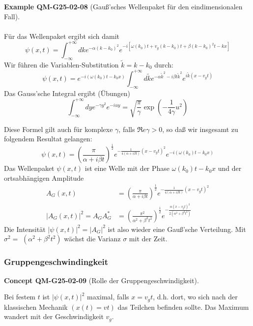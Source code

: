 \documentclass[10pt, letterpaper]{article}
\newcommand{\CustomHeading}[3]{%
  \par\medskip\noindent%
  \textbf{#1 #2} \textnormal{(#3)}.\enskip%
}
\newenvironment{EXA}[2]{\begin{unitbox}\CustomHeading{Example}{#1}{#2}}{\end{unitbox}}
\newenvironment{CONC}[2]{\begin{unitbox}\CustomHeading{Concept}{#1}{#2}}{\end{unitbox}}
\begin{document}
\begin{EXA}{QM-G25-02-08}{Gauß'sches Wellenpaket für den eindimensionalen Fall}
$$\begin{array}{rlrl}
\end{array}
$$
Für das Wellenpaket ergibt sich damit
$$
\psi(x, t)=\int_{-\infty}^{+\infty} d k e^{-\alpha\left(k-k_{0}\right)^{2}} e^{-i\left[\omega\left(k_{0}\right) t+v_{g}\left(k-k_{0}\right) t+\beta\left(k-k_{0}\right)^{2} t-k x\right]}
$$
Wir führen die Variablen-Substitution $\tilde{k}=k-k_{0}$ durch:
$$
\psi(x, t)=e^{-i\left(\omega\left(k_{0}\right) t-k_{0} x\right)} \int_{-\infty}^{+\infty} d \tilde{k} e^{-\alpha \tilde{k}^{2}-i \beta t \tilde{k}^{2}} e^{i \tilde{k}\left(x-v_{g} t\right)}
$$
Das Gauss'sche Integral ergibt (Übungen)
$$
\int_{-\infty}^{+\infty} d y e^{-\gamma y^{2}} e^{-i u y}=\sqrt{\frac{\pi}{\gamma}} \exp \left(-\frac{1}{4 \gamma} u^{2}\right)
$$

Diese Formel gilt auch für komplexe $\gamma$, falls $\Re e \gamma>0$, so daß wir insgesamt zu folgendem Resultat gelangen:
$$
\psi(x, t)=\left(\frac{\pi}{\alpha+i \beta t}\right)^{\frac{1}{2}} e^{-\frac{1}{4(\alpha+i \beta t)}\left(x-v_{g} t\right)^{2}} e^{-i\left(\omega\left(k_{0}\right) t-k_{0} x\right)}
$$
Das Wellenpaket $\psi(x, t)$ ist eine Welle mit der Phase $\omega\left(k_{0}\right) t-k_{0} x$ und der ortsabhängigen Amplitude
$$
\begin{aligned}
A_{G}(x, t) & =\left(\frac{\pi}{\alpha+i \beta t}\right)^{\frac{1}{2}} e^{-\frac{1}{4(\alpha+i \beta t)}\left(x-v_{g} t\right)^{2}} \\
\left|A_{G}(x, t)\right|^{2}=A_{G} A_{G}^{*} & =\left(\frac{\pi^{2}}{\alpha^{2}+\beta^{2} t^{2}}\right)^{\frac{1}{2}} e^{-\frac{\alpha\left(x-v_{g} t\right)^{2}}{2\left(\alpha^{2}+\beta^{2} t^{2}\right)}}
\end{aligned}
$$
Die Intensität $|\psi(x, t)|^{2}=\left|A_{G}\right|^{2}$ ist also wieder eine Gauß'sche Verteilung. Mit $\sigma^{2}=$ $\left(\alpha^{2}+\beta^{2} t^{2}\right)$ wächst die Varianz $\sigma$ mit der Zeit.
\end{EXA}



\subsubsection*{Gruppengeschwindingkeit}


\begin{CONC}{QM-G25-02-09}{Rolle der Gruppengeschwindigkeit}
Bei festem $t$ ist $|\psi(x, t)|^{2}$ maximal, falls $x=v_{g} t$, d.h. dort, wo sich nach der klassischen Mechanik $(x(t)=v t)$ das Teilchen befinden sollte. Das Maximum wandert mit der Geschwindigkeit $v_{g}$.
\end{CONC}
\end{document}
